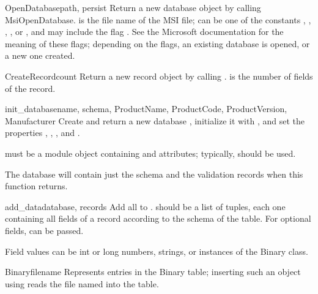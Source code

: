 \begin{funcdesc}{OpenDatabase}{path, persist}
  Return a new database object by calling MsiOpenDatabase.  
   is the file name of the
  MSI file;  can be one of the constants 
  , ,
  , , or
  , and may include the flag
  . See the Microsoft documentation for
  the meaning of these flags; depending on the flags,
  an existing database is opened, or a new one created.
\end{funcdesc}

\begin{funcdesc}{CreateRecord}{count}
  Return a new record object by calling .
   is the number of fields of the record.
\end{funcdesc}

\begin{funcdesc}{init_database}{name, schema, ProductName, ProductCode, ProductVersion, Manufacturer}
  Create and return a new database , initialize it 
  with ,  and set the properties ,
  , , and .

   must be a module object containing  and
   attributes; typically,
   should be used.

  The database will contain just the schema and the validation
  records when this function returns.
\end{funcdesc}

\begin{funcdesc}{add_data}{database, records}
  Add all  to .   should
  be a list of tuples, each one containing all fields of a record
  according to the schema of the table.  For optional fields,
   can be passed.

  Field values can be int or long numbers, strings, or instances
  of the Binary class.
\end{funcdesc}

\begin{classdesc}{Binary}{filename}
  Represents entries in the Binary table; inserting such
  an object using  reads the file named
   into the table.
\end{classdesc}

